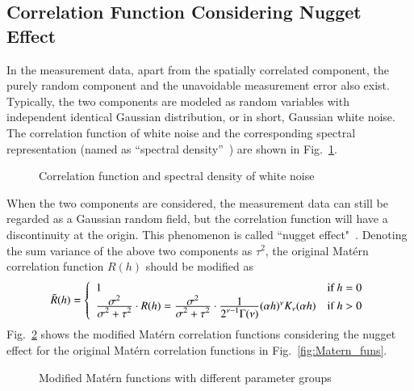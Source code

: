 \documentclass[referee]{ieice}
\begin{document}
\subsection{Correlation Function Considering Nugget Effect}
In the measurement data, apart from the spatially correlated component,
the purely random component and the unavoidable measurement error
also exist. Typically, the two components are modeled as random
variables with independent identical Gaussian distribution, or in short, Gaussian white noise.
The correlation function of white noise and the corresponding spectral representation (named as
``spectral density''~\cite{Fu08}) are shown in Fig.~\ref{fig:white_noise}.
\begin{figure}[tb]
  \centering
  \caption{Correlation function and spectral density of white noise}
  \label{fig:white_noise} %
\end{figure}

When the two components are considered, the measurement data can still be regarded as a
Gaussian random field, but the correlation function will have a discontinuity at the origin.
This phenomenon is called ``nugget effect"~\cite{Diggle07}.
Denoting the sum variance of the above two components as $\tau^2$, the original Mat\'{e}rn correlation function
$R(h)$ should be modified as
\begin{equation}
\tilde{R}(h)=\left\{ \begin{array}{l l}
 1 & \textrm{if $h=0$} \\
 \frac{\displaystyle \sigma^2}{\displaystyle \sigma^2+\displaystyle \tau^2}\cdot R(h) = \frac{\displaystyle \sigma^2}{\displaystyle \sigma^2+\displaystyle \tau^2}\cdot \frac{\displaystyle 1}{\displaystyle 2^{\nu-1}\Gamma(\nu)}(\alpha h)^\nu K_\nu(\alpha h) & \textrm{if $h>0$}
\end{array} \right.
\end{equation}
Fig.~\ref{fig:modi_Matern_funs} shows the modified Mat\'{e}rn correlation functions considering the nugget effect for
the original Mat\'{e}rn correlation functions in Fig.~\ref{fig:Matern_funs}.
\begin{figure}[tb]
  \begin{center}
    \caption{Modified Mat\'{e}rn functions with different parameter groups } \label{fig:modi_Matern_funs}
  \end{center}
\end{figure}
\end{document}
